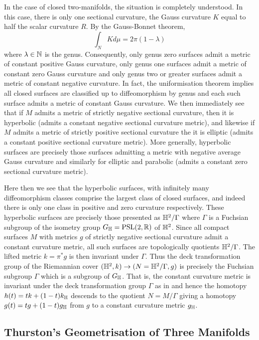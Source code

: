 \documentclass[a4paper,12pt]{amsart}
\begin{document}
In the case of closed two-manifolds, the situation is completely understood. In this case, there is only one sectional curvature, the Gauss curvature \(K\) equal to half the scalar curvature \(R\). By the Gauss-Bonnet theorem,
\[
\int_N K d\mu = 2\pi(1-\lambda)
\]
where \(\lambda \in \mathbb{N}\) is the genus. Consequently, only genus zero surfaces admit a metric of constant positive Gauss curvature, only genus one surfaces admit a metric of constant zero Gauss curvature and only genus two or greater surfaces admit a metric of constant negative curvature. In fact, the uniformisation theorem implies all closed surfaces are classified up to diffeomorphism by genus and each such surface admits a metric of constant Gauss curvature. We then immediately see that if \(M\) admits a metric of strictly negative sectional curvature, then it is hyperbolic (admits a constant negative sectional curvature metric), and likewise if \(M\) admits a metric of strictly positive sectional curvature the it is elliptic (admits a constant positive sectional curvature metric). More generally, hyperbolic surfaces are precisely those surfaces admitting a metric with negative average Gauss curvature and similarly for elliptic and parabolic (admits a constant zero sectional curvature metric).

Here then we see that the hyperbolic surfaces, with infinitely many diffeomorphism classes comprise the largest class of closed surfaces, and indeed there is only one class in positive and zero curvature respectively. These hyperbolic surfaces are precisely those presented as \(\mathbb{H}^2/\Gamma\) where \(\Gamma\) is a Fuchsian subgroup of the isometry group \(G_{\mathbb{H}} = \text{PSL}(2, \mathbb{R})\) of \(\mathbb{H}^2\). Since all compact surfaces \(M\) with metrics \(g\) of strictly negative sectional curvature admit a constant curvature metric, all such surfaces are topologically quotients \(\mathbb{H}^2/\Gamma\). The lifted metric \(k = \pi^{\ast} g\) is then invariant under \(\Gamma\). Thus the deck transformation group of the Riemannian cover \((\mathbb{H}^2, k) \to (N = \mathbb{H}^2/\Gamma, g)\) is precisely the Fuchsian subgroup \(\Gamma\) which is a subgroup of \(G_{\mathbb{H}}\). That is, the constant curvature metric is invariant under the deck transformation group \(\Gamma\) as in  and hence the homotopy \(h(t) = t k + (1-t)k_{\mathbb{H}}\) descends to the quotient \(N = M/\Gamma\) giving a homotopy \(g(t) = t g + (1-t)g_{\mathbb{H}}\) from \(g\) to a constant curvature metric \(g_{\mathbb{H}}\).

\subsection{Thurston's Geometrisation of Three Manifolds}
\label{sec:geometrisation_3d}
\end{document}
